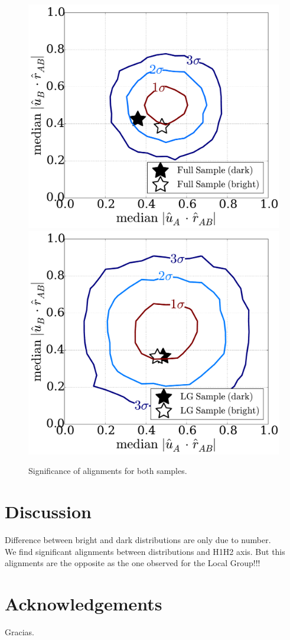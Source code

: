 \begin{figure}
\includegraphics[width=0.48\hsize]{significance_full_bright.pdf}
\includegraphics[width=0.48\hsize]{significance_lg_bright.pdf}
\caption{Significance of alignments for both samples.}
\label{fig:significance}
\end{figure}



\section{Discussion}
\label{Discussion}
Difference between bright and dark distributions are only due to number.\\
We find significant alignments between distributions and H1H2 axis. But this alignments are the opposite as the one observed for the Local Group!!! 
 
\section{Acknowledgements}
Gracias.

